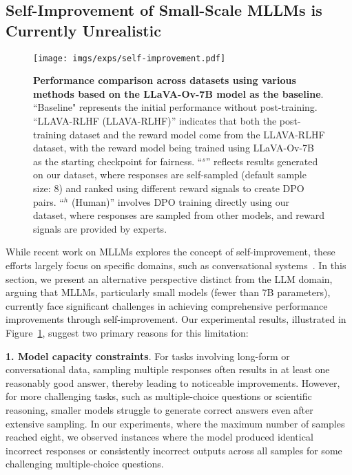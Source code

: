 \subsection{{Self-Improvement of Small-Scale MLLMs is Currently Unrealistic}}

\begin{figure}
    \centering\texttt{[image: imgs/exps/self-improvement.pdf]}
    \caption{\textbf{Performance comparison across datasets using various methods based on the LLaVA-Ov-7B model as the baseline}. ``Baseline" represents the initial performance without post-training. ``LLAVA-RLHF (LLAVA-RLHF)'' indicates that both the post-training dataset and the reward model come from the LLAVA-RLHF dataset, with the reward model being trained using LLaVA-Ov-7B as the starting checkpoint for fairness. ``\abbr$^s$'' reflects results generated on our dataset, where responses are self-sampled (default sample size: 8) and ranked using different reward signals to create DPO pairs. ``\abbr$^h$ (Human)'' involves DPO training directly using our dataset, where responses are sampled from other models, and reward signals are provided by experts.}
    \label{fig:self-improvement}
\end{figure}

While recent work on MLLMs explores the concept of self-improvement, these efforts largely focus on specific domains, such as conversational systems~\cite{xiong2024llava}. In this section, we present an alternative perspective distinct from the LLM domain, arguing that MLLMs, particularly small models (fewer than 7B parameters), currently face significant challenges in achieving comprehensive performance improvements through self-improvement. Our experimental results, illustrated in Figure~\ref{fig:self-improvement}, suggest two primary reasons for this limitation:

\textbf{1. Model capacity constraints}. 
For tasks involving long-form or conversational data, sampling multiple responses often results in at least one reasonably good answer, thereby leading to noticeable improvements. However, for more challenging tasks, such as multiple-choice questions or scientific reasoning, smaller models struggle to generate correct answers even after extensive sampling. In our experiments, where the maximum number of samples reached eight, we observed instances where the model produced identical incorrect responses or consistently incorrect outputs across all samples for some challenging multiple-choice questions.

